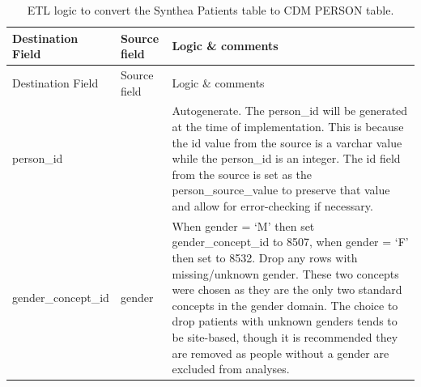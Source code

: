 \documentclass[11pt]{book}
\theoremstyle{definition}
\theoremstyle{definition}
\theoremstyle{definition}
\theoremstyle{remark}
\begin{document}
\begin{longtable}[]{@{}lll@{}}
\caption{\label{tab:syntheaEtlPerson} ETL logic to convert the Synthea Patients table to CDM PERSON table.}\tabularnewline
\toprule
\begin{minipage}[b]{0.28\columnwidth}\raggedright
Destination Field\strut
\end{minipage} & \begin{minipage}[b]{0.12\columnwidth}\raggedright
Source field\strut
\end{minipage} & \begin{minipage}[b]{0.51\columnwidth}\raggedright
Logic \& comments\strut
\end{minipage}\tabularnewline
\midrule
\endfirsthead
\toprule
\begin{minipage}[b]{0.28\columnwidth}\raggedright
Destination Field\strut
\end{minipage} & \begin{minipage}[b]{0.12\columnwidth}\raggedright
Source field\strut
\end{minipage} & \begin{minipage}[b]{0.51\columnwidth}\raggedright
Logic \& comments\strut
\end{minipage}\tabularnewline
\midrule
\endhead
\begin{minipage}[t]{0.28\columnwidth}\raggedright
person\_id\strut
\end{minipage} & \begin{minipage}[t]{0.12\columnwidth}\raggedright
\strut
\end{minipage} & \begin{minipage}[t]{0.51\columnwidth}\raggedright
Autogenerate. The person\_id will be generated at the time of implementation. This is because the id value from the source is a varchar value while the person\_id is an integer. The id field from the source is set as the person\_source\_value to preserve that value and allow for error-checking if necessary.\strut
\end{minipage}\tabularnewline
\begin{minipage}[t]{0.28\columnwidth}\raggedright
gender\_concept\_id\strut
\end{minipage} & \begin{minipage}[t]{0.12\columnwidth}\raggedright
gender\strut
\end{minipage} & \begin{minipage}[t]{0.51\columnwidth}\raggedright
When gender = `M' then set gender\_concept\_id to 8507, when gender = `F' then set to 8532. Drop any rows with missing/unknown gender. These two concepts were chosen as they are the only two standard concepts in the gender domain. The choice to drop patients with unknown genders tends to be site-based, though it is recommended they are removed as people without a gender are excluded from analyses.\strut

\end{minipage}
\end{longtable}
\end{document}
